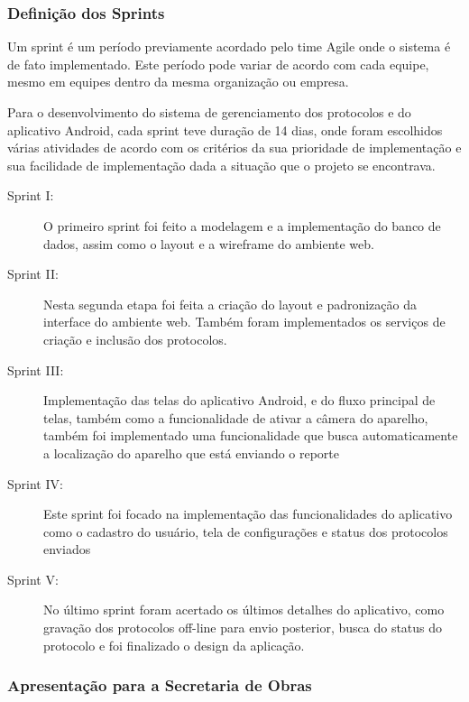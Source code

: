 \documentclass[
	article,			%
	11pt,				%
	oneside,			%
	a4paper,			%
	english,			%
	brazil,				%
	sumario=tradicional
	]{abntex2}
\begin{document}
\subsubsection{Definição dos Sprints}

Um sprint é um período previamente acordado pelo time Agile onde o sistema é de
fato implementado. Este período pode variar de acordo com cada equipe, mesmo em
equipes dentro da mesma organização ou empresa.

Para o desenvolvimento do sistema de gerenciamento dos protocolos e do aplicativo
Android, cada sprint teve duração de 14 dias, onde foram escolhidos várias
atividades de acordo com os critérios da sua prioridade de implementação e sua
facilidade de implementação dada a situação que o projeto se encontrava.

\begin{description}
\item[Sprint I:]
O primeiro sprint foi feito a modelagem e a implementação do
banco de dados, assim como o layout e a wireframe do ambiente web.

\item[Sprint II:]
Nesta segunda etapa foi feita a criação do layout e padronização da interface
do ambiente web. Também foram implementados os serviços de criação e inclusão
dos protocolos.

\item[Sprint III:]
Implementação das telas do aplicativo Android, e do fluxo principal de telas,
também como a funcionalidade de ativar a câmera do aparelho, também foi
implementado uma funcionalidade que busca automaticamente a localização do
aparelho que está enviando o reporte

\item[Sprint IV:]
Este sprint foi focado na implementação das funcionalidades do aplicativo como
o cadastro do usuário, tela de configurações e status dos protocolos enviados

\item[Sprint V:]
No último sprint foram acertado os últimos detalhes do aplicativo, como
gravação dos protocolos off-line para envio posterior, busca do status do
protocolo e foi finalizado o design da aplicação.
\end{description}

\subsubsection{Apresentação para a Secretaria de Obras}
\end{document}
